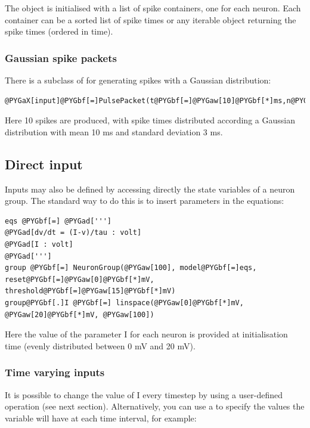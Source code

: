 \documentclass[letterpaper,10pt,english]{manual}
\begin{document}
The object is initialised with a list of spike containers, one for each neuron.
Each container can be a sorted list of spike times or any iterable object returning
the spike times (ordered in time).


\subsubsection{Gaussian spike packets}

There is a subclass of \hyperlink{brian.SpikeGeneratorGroup}{} for generating spikes with a Gaussian
distribution:

\begin{Verbatim}[commandchars=@\[\]]
@PYGaX[input]@PYGbf[=]PulsePacket(t@PYGbf[=]@PYGaw[10]@PYGbf[*]ms,n@PYGbf[=]@PYGaw[10],sigma@PYGbf[=]@PYGaw[3]@PYGbf[*]ms)
\end{Verbatim}

Here 10 spikes are produced, with spike times distributed according a Gaussian distribution with
mean 10 ms and standard deviation 3 ms.


\subsection{Direct input}

Inputs may also be defined by accessing directly the state variables of a neuron group. The standard way
to do this is to insert parameters in the equations:

\begin{Verbatim}[commandchars=@\[\]]
eqs @PYGbf[=] @PYGad[''']
@PYGad[dv/dt = (I-v)/tau : volt]
@PYGad[I : volt]
@PYGad[''']
group @PYGbf[=] NeuronGroup(@PYGaw[100], model@PYGbf[=]eqs, reset@PYGbf[=]@PYGaw[0]@PYGbf[*]mV, threshold@PYGbf[=]@PYGaw[15]@PYGbf[*]mV)
group@PYGbf[.]I @PYGbf[=] linspace(@PYGaw[0]@PYGbf[*]mV, @PYGaw[20]@PYGbf[*]mV, @PYGaw[100])
\end{Verbatim}

Here the value of the parameter I for each neuron is provided at initialisation time
(evenly distributed between 0 mV and 20 mV).


\subsubsection{Time varying inputs}

It is possible to change the value of I every timestep by using a user-defined operation (see next
section). Alternatively, you can use a \hyperlink{brian.TimedArray}{} to specify the values the variable will
have at each time interval, for example:
\end{document}
